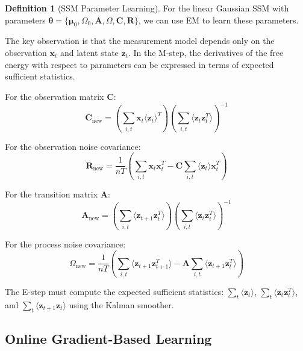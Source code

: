\documentclass[12pt,a4paper]{article}
\theoremstyle{definition}
\newtheorem{definition}{Definition}[section]
\begin{document}
\begin{definition}[SSM Parameter Learning]
For the linear Gaussian SSM with parameters $\boldsymbol{\theta} = \{\boldsymbol{\mu}_0, \Omega_0, \mathbf{A}, \Omega, \mathbf{C}, \mathbf{R}\}$, we can use EM to learn these parameters.

The key observation is that the measurement model depends only on the observation $\mathbf{x}_t$ and latent state $\mathbf{z}_t$. In the M-step, the derivatives of the free energy with respect to parameters can be expressed in terms of expected sufficient statistics.

For the observation matrix $\mathbf{C}$:
\[
\mathbf{C}_{\text{new}} = \left(\sum_{i,t} \mathbf{x}_t \langle \mathbf{z}_t \rangle^T\right) \left(\sum_{i,t} \langle \mathbf{z}_t \mathbf{z}_t^T \rangle\right)^{-1}
\]

For the observation noise covariance:
\[
\mathbf{R}_{\text{new}} = \frac{1}{n T} \left(\sum_{i,t} \mathbf{x}_t \mathbf{x}_t^T - \mathbf{C} \sum_{i,t} \langle \mathbf{z}_t \rangle \mathbf{x}_t^T\right)
\]

For the transition matrix $\mathbf{A}$:
\[
\mathbf{A}_{\text{new}} = \left(\sum_{i,t} \langle \mathbf{z}_{t+1} \mathbf{z}_t^T \rangle\right) \left(\sum_{i,t} \langle \mathbf{z}_t \mathbf{z}_t^T \rangle\right)^{-1}
\]

For the process noise covariance:
\[
\Omega_{\text{new}} = \frac{1}{n T} \left(\sum_{i,t} \langle \mathbf{z}_{t+1} \mathbf{z}_{t+1}^T \rangle - \mathbf{A} \sum_{i,t} \langle \mathbf{z}_{t+1} \mathbf{z}_t^T \rangle\right)
\]

The E-step must compute the expected sufficient statistics: $\sum_t \langle \mathbf{z}_t \rangle$, $\sum_t \langle \mathbf{z}_t \mathbf{z}_t^T \rangle$, and $\sum_t \langle \mathbf{z}_{t+1} \mathbf{z}_t \rangle$ using the Kalman smoother.
\end{definition}

\subsection{Online Gradient-Based Learning}
\end{document}

